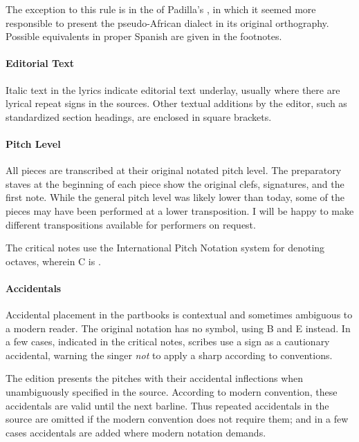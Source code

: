 The exception to this rule is in the  of Padilla's , in which it seemed more responsible to present the 
pseudo-African dialect in its original orthography.
Possible equivalents in proper Spanish are given in the footnotes.

\paragraph{Editorial Text}
Italic text in the lyrics indicate editorial text underlay, usually where there 
are lyrical repeat signs in the sources.
Other textual additions by the editor, such as standardized section headings, 
are enclosed in square brackets.

\paragraph{Pitch Level}
All pieces are transcribed at their original notated pitch level.
The preparatory staves at the beginning of each piece show the original clefs, 
signatures, and the first note.
While the  general pitch level was likely lower than today, some of the pieces 
may have been performed at a lower transposition.
I will be happy to make different transpositions available for performers on 
request.

The critical notes use the International Pitch Notation system for denoting 
octaves, wherein C is .



\paragraph{Accidentals}
Accidental placement in the partbooks is contextual and sometimes ambiguous to 
a modern reader.
The original notation has no \na{} symbol, using B\sh{} and E\sh{} instead.
In a few cases, indicated in the critical notes, scribes use a \sh{} sign as a 
cautionary accidental, warning the singer \emph{not} to apply a sharp according 
to  conventions.%
  \autocites{Harran:Cautionary1}{Harran:Cautionary2}

The edition presents the pitches with their accidental inflections when 
unambiguously specified in the source.
According to modern convention, these accidentals are valid until the next 
barline.
Thus repeated accidentals in the source are omitted if the modern convention 
does not require them; and in a few cases accidentals are added where modern 
notation demands.

